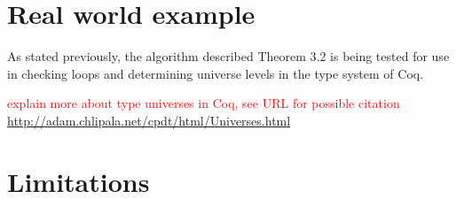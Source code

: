 \section{Real world example}
\label{sec:real_world_example}

As stated previously, the algorithm described Theorem 3.2 is being
tested for use in checking loops and determining universe levels in the
type system of Coq.

\textcolor{red}{explain more about type universes in Coq, see URL for possible citation}
\url{http://adam.chlipala.net/cpdt/html/Universes.html}

\section{Limitations}
\label{sec:limitations}
